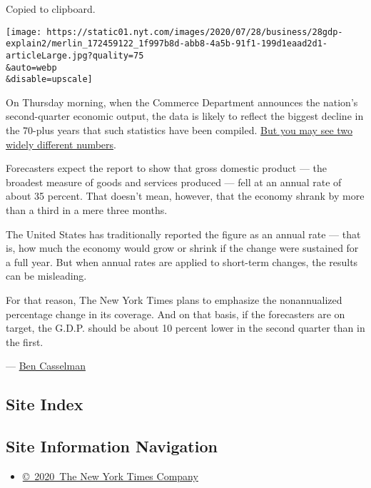 Copied to clipboard.

\texttt{[image: https://static01.nyt.com/images/2020/07/28/business/28gdp-explain2/merlin\_172459122\_1f997b8d-abb8-4a5b-91f1-199d1eaad2d1-articleLarge.jpg?quality=75\\\&auto=webp\\\&disable=upscale]}

On Thursday morning, when the Commerce Department announces the nation's
second-quarter economic output, the data is likely to reflect the
biggest decline in the 70-plus years that such statistics have been
compiled.
\href{https://www.nytimes.com/2020/07/29/business/economy/us-gdp-report.html}{But
you may see two widely different numbers}.

Forecasters expect the report to show that gross domestic product ---
the broadest measure of goods and services produced --- fell at an
annual rate of about 35 percent. That doesn't mean, however, that the
economy shrank by more than a third in a mere three months.

The United States has traditionally reported the figure as an annual
rate --- that is, how much the economy would grow or shrink if the
change were sustained for a full year. But when annual rates are applied
to short-term changes, the results can be misleading.

For that reason, The New York Times plans to emphasize the nonannualized
percentage change in its coverage. And on that basis, if the forecasters
are on target, the G.D.P. should be about 10 percent lower in the second
quarter than in the first.

--- \href{https://www.nytimes.com/by/ben-casselman}{Ben Casselman}

\hypertarget{site-index}{%
\subsection{Site Index}\label{site-index}}

\hypertarget{site-information-navigation}{%
\subsection{Site Information
Navigation}\label{site-information-navigation}}

\begin{itemize}
\tightlist
\item
  \href{https://help.nytimes.com/hc/en-us/articles/115014792127-Copyright-notice}{©~2020~The
  New York Times Company}
\end{itemize}

